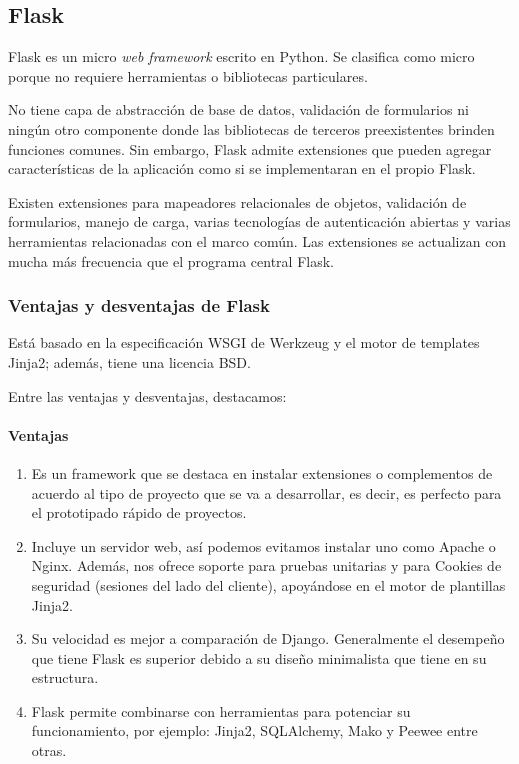 \subsection*{Flask}
Flask es un micro \textit{web framework} escrito en Python. Se clasifica como micro porque no requiere herramientas o bibliotecas particulares.


No tiene capa de abstracción de base de datos, validación de formularios ni ningún otro componente donde las bibliotecas de terceros preexistentes brinden funciones comunes. Sin embargo, Flask admite extensiones que pueden agregar características de la aplicación como si se implementaran en el propio Flask.


Existen extensiones para mapeadores relacionales de objetos, validación de formularios, manejo de carga, varias tecnologías de autenticación abiertas y varias herramientas relacionadas con el marco común. Las extensiones se actualizan con mucha más frecuencia que el programa central Flask.


\subsubsection*{Ventajas y desventajas de Flask}
Está basado en la especificación WSGI de Werkzeug y el motor de templates Jinja2; además, tiene una licencia BSD.


Entre las ventajas y desventajas, destacamos:

\paragraph*{Ventajas}
\begin{enumerate}
    \item Es un framework que se destaca en instalar extensiones o complementos de acuerdo al tipo de proyecto que se va a desarrollar, es decir, es perfecto para el prototipado rápido de proyectos.
    \item Incluye un servidor web, así podemos evitamos instalar uno como Apache o Nginx. Además, nos ofrece soporte para pruebas unitarias y para Cookies de seguridad (sesiones del lado del cliente), apoyándose en el motor de plantillas ​Jinja2​.
    \item Su velocidad es mejor a comparación de Django. Generalmente el desempeño que tiene Flask es superior debido a su diseño minimalista que tiene en su estructura.
    \item  Flask permite combinarse con herramientas para potenciar su funcionamiento, por ejemplo: Jinja2, SQLAlchemy, Mako y Peewee entre otras.
\end{enumerate}
